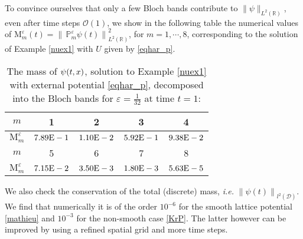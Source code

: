 \documentclass[leqno,final]{siamltex}
\numberwithin{equation}{section}
\newcounter{me}
\begin{document}
To convince ourselves that only a few Bloch bands contribute to
$\|\psi \|_{L^2({{\mathbb R}})}$, even after time steps ${\mathcal O}(1)$, we show in
the following table the numerical values of $\mathrm
M^{{\varepsilon }}_m(t)={\big \| \, \mathbb P^{{\varepsilon }}_m \psi(t) \big\|}^2_{L^2({{\mathbb R}})}$,
for $m=1,\cdots,8$, corresponding to the solution of Example
\ref{nuex1} with $U$ given by \eqref{eqhar_p}.
\begin{table}[htbp]
\caption{The mass of $\psi_{\rm }(t,x)$, solution to Example
\ref{nuex1} with external potential \eqref{eqhar_p}, decomposed
into the Bloch bands for ${{\varepsilon }}=\frac{1}{32}$ at time
$t=1$:}\label{tab_energy1}
\begin{center}\footnotesize

\begin{tabular}{ccccc}
\hline $m$ & 1 & 2& 3& 4\\ \hline $\mathrm M_m^{{\varepsilon }}$
&     $7.89{\rm{E}}-1$
&     $1.10{\rm{E}}-2$
&     $5.92{\rm{E}}-1$
&     $9.38{\rm{E}}-2$
\\ \hline $m$ & 5& 6& 7& 8\\ \hline $\mathrm M_m^{{\varepsilon }}$
&     $7.15{\rm{E}}-2$
&     $3.50{\rm{E}}-3$
&     $1.80{\rm{E}}-3$
&     $5.63{\rm{E}}-5$
\\ \hline
\end{tabular}
\end{center}
\end{table}

We also check the conservation of the total (discrete) mass, {{\sl i.e.\/ }}
${\|\psi(t) \|}_{l^2(\mathcal D)}$. We find that numerically it is
of the order $10^{-6}$ for the smooth lattice potential
\eqref{mathieu} and $10^{-3}$ for the non-smooth case \eqref{KrP}.
The latter however can be improved by using a refined spatial grid
and more time steps.
\end{document}
